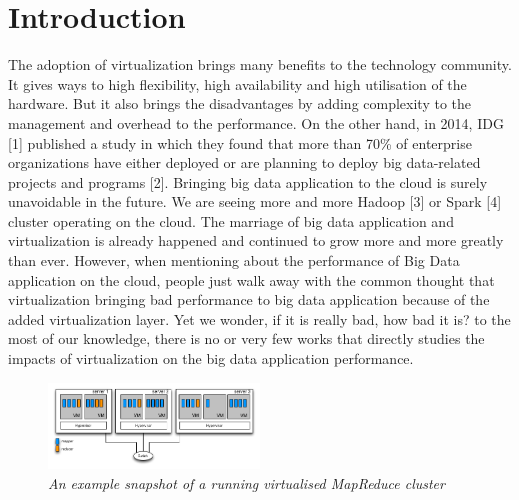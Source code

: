 \documentclass{acmsig}
\begin{document}
\section{Introduction}

The adoption of virtualization brings many benefits to the technology community. It gives ways to high flexibility, high availability and high utilisation of the hardware. But it also brings the disadvantages by adding complexity to the management and overhead to the performance. On the other hand, in 2014, IDG [1] published a study in which they found that more than 70\% of enterprise organizations have either deployed or are planning to deploy big data-related projects and programs [2]. Bringing big data application to the cloud is surely unavoidable in the future. We are seeing more and more Hadoop [3] or Spark [4] cluster operating on the cloud. The marriage of big data application and virtualization is already happened and continued to grow more and more greatly than ever. However, when mentioning about the performance of Big Data application on the cloud, people just walk away with the common thought that virtualization bringing bad performance to big data application because of the added virtualization layer. Yet we wonder, if it is really bad, how bad it is? to the most of our knowledge, there is no or very few works that directly studies the impacts of virtualization on the big data application performance.

\begin{figure}[htbp]
    \centering
    \includegraphics[width=0.5\textwidth]{figures/cluster_snapshot.png}
    \caption{\textit{An example snapshot of a running virtualised MapReduce cluster}}
    \label{cluster_snapshot}
\end{figure}
\end{document}
